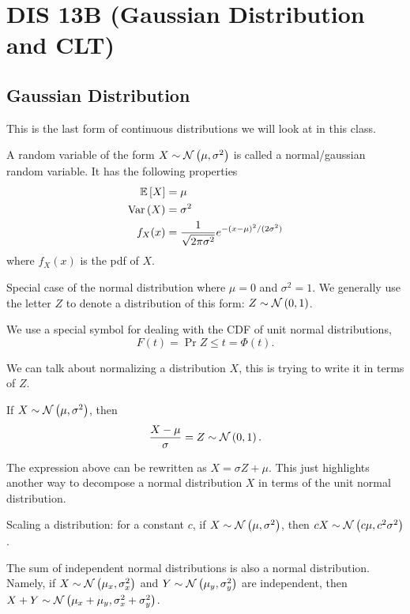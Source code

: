 \section{DIS 13B (Gaussian Distribution and CLT)}

\subsection{Gaussian Distribution}

This is the last form of continuous distributions we will look at in this class. 

A random variable of the form $X \sim \mathcal{N}\left( \mu, \sigma^2 \right)$ is called a normal/gaussian random variable. It has the following properties \begin{align*}
    \mathbb{E}\left[ X \right] &= \mu \\
    \text{Var}\left( X \right) &= \sigma^2 \\ 
    f_X(x) &= \frac{1}{\sqrt{2\pi\sigma^2}}e^{-(x-\mu)^2/(2\sigma^2)}
\end{align*}
where $f_X(x)$ is the pdf of $X$. 

\begin{definition}
    Special case of the normal distribution where $\mu = 0$ and $\sigma^2 = 1$. We generally use the letter $Z$ to denote a distribution of this form: $Z \sim \mathcal{N}\left( 0, 1 \right)$. 
\end{definition}

We use a special symbol for dealing with the CDF of unit normal distributions, \[ F(t) = \Pr{Z \le t} = \Phi(t). \]

We can talk about normalizing a distribution $X$, this is trying to write it in terms of $Z$.

If $X \sim \mathcal{N}\left( \mu, \sigma^2 \right)$, then \[ \frac{X - \mu}{\sigma} = Z \sim \mathcal{N}\left( 0, 1 \right). \]

The expression above can be rewritten as $X = \sigma Z + \mu$. This just highlights another way to decompose a normal distribution $X$ in terms of the unit normal distribution. 

Scaling a distribution: for a constant $c$, if $X \sim \mathcal{N}\left( \mu, \sigma^2 \right)$, then $cX \sim \mathcal{N}\left( c\mu, c^2\sigma^2 \right)$. 

\begin{theorem}
    The sum of independent normal distributions is also a normal distribution. Namely, if $X \sim \mathcal{N}\left( \mu_x, \sigma^2_x \right)$ and $Y \sim \mathcal{N}\left( \mu_y, \sigma^2_y \right)$ are independent, then $X+Y \sim \mathcal{N}\left( \mu_x+\mu_y, \sigma^2_x+\sigma^2_y \right)$. 
\end{theorem}

